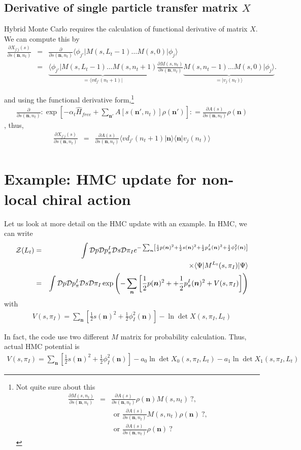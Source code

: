 \documentclass[10pt]{book}
\def\bm{\boldsymbol}
\newcommand{\bea}{\begin{eqnarray}}
\newcommand{\eea}{\end{eqnarray}}
\newcommand{\no}{\nonumber \\}
\newcommand{\del}{\partial}
\def\vn{{\bm n}}
\def\la{\langle}
\def\ra{\rangle}
\begin{document}
\subsection{ Derivative of single particle transfer matrix $X$   } 
Hybrid Monte Carlo requires the calculation of 
functional derivative of matrix $X$.
We can compute this by
\bea 
\frac{\del X_{j' j}(s)}{\del s(\vn,n_t)}
&=&\frac{\del}{\del s(\vn,n_t)} \la \phi_{j'}|M(s,L_t-1)\dots M(s,0)|\phi_{j}\ra \no 
&=&\underbrace{ \la \phi_{j'}|M(s,L_t-1)\dots M(s,n_t+1)}_{=\la vd_{j'}(n_t+1)|} 
              \frac{\del M(s,n_t)}{\del s(\vn,n_t)}
              \underbrace{ M(s,n_t-1)\dots M(s,0)|\phi_{j}\ra}_{= |v_{j}(n_t)\ra}.           
\eea 

and using the functional derivative form,\footnote{
Not quite sure about this
\bea 
\frac{\del M(s,n_t)}{\del s(\vn,n_t)} 
&=& \frac{\del A(s)}{\del s(\vn,n_t)}\rho(\vn) M(s,n_t)\ ?,\no 
&  &\mbox{ or } \frac{\del A(s)}{\del s(\vn,n_t)} M(s,n_t)  \rho(\vn)\ ?,\no 
&  &\mbox{ or } \frac{\del A(s)}{\del s(\vn,n_t)}\rho(\vn)\ ?
\eea 
} 
\bea 
\frac{\del}{\del s(\vn,n_t)} 
:\exp\left[-\alpha_t \hat{H}_{free}+\sum_{\vn'} A[s(\vn',n_t)] \rho(\vn') \right]:
= \frac{\del A(s)}{\del s(\vn,n_t)}\rho(\vn)
\eea 
, thus,
\bea 
\frac{\del X_{j' j}(s)}{\del s(\vn,n_t)}
&=&\frac{\del A(s)}{\del s(\vn,n_t)} \la vd_{j'}(n_t+1)|\vn\ra \la \vn |v_{j}(n_t)\ra \no       
\eea 

\section{Example: HMC update for non-local chiral action}

Let us look at more detail on the HMC update with an example.
In HMC, we can write 
\bea 
{\cal Z}(L_t)&=&\int {\cal D} p{\cal D}p^I_\pi {\cal D}s {\cal D}\pi_I 
         e^{-\sum_{\vn} \left[ \frac{1}{2} p(\vn)^2  + \frac{1}{2} s(\vn)^2
                                    +\frac{1}{2} p_\pi^I(\vn)^2 +\frac{1}{2} \phi_I^2(\vn)\right] 
         } \no & &\times \la \Psi| M^{L_t}(s,\pi_I)|\Psi\ra  \no 
     &=& \int {\cal D} p{\cal D}p^I_\pi {\cal D}s {\cal D}\pi_I 
     \exp\left( -\sum_{\vn} \left[ \frac{1}{2} p(\vn)^2  + 
     	+\frac{1}{2} p_\pi^I(\vn)^2  +V(s,\pi_I)\right] \right) 
\eea 
with 
\bea 
V(s,\pi_I)=\sum_\vn\left[ \frac{1}{2} s(\vn)^2+\frac{1}{2} \phi_I^2(\vn)\right] -\ln \det X(s,\pi_I,L_t)
\eea 

In fact, the code use two different $M$ matrix for probability calculation. Thus, actual HMC potential is 
\bea 
V(s,\pi_I)=\sum_\vn\left[ \frac{1}{2} s(\vn)^2+\frac{1}{2} \phi_I^2(\vn)\right] 
    -a_0\ln \det X_0(s,\pi_I,L_t)-a_1\ln \det X_1(s,\pi_I,L_t)
\eea 
\end{document}
